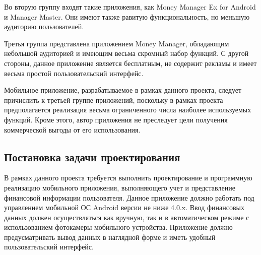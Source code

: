 Во вторую группу входят такие приложения, как
Money Manager Ex for Android и Manager Master.
Они имеют также равитую функциональность, но меньшую аудиторию пользователей.

Третья группа представлена приложением Money Manager,
обладающим небольшой аудиторией и имеющим весьма скромный набор функций.
С другой стороны, данное приложение является бесплатным, не содержит рекламы
и имеет весьма простой пользовательский интерфейс.

Мобильное приложение, разрабатываемое в рамках данного проекта,
следует причислить к третьей группе приложений,
поскольку в рамках проекта предполагается реализация весьма
ограниченного числа наиболее используемых функций.
Кроме этого, автор приложения не преследует цели получения коммерческой выгоды
от его использования.

\subsection{Постановка задачи проектирования}

В рамках данного проекта требуется выполнить проектирование и
программную реализацию мобильного приложения, выполняющего учет и представление
финансовой информации пользователя.
Данное приложение должно работать под управлением мобильной ОС Android версии
не ниже 4.0.x. Ввод финансовых данных должен осуществляться как вручную,
так и в автоматическом режиме с использованием фотокамеры мобильного устройства.
Приложение должно предусматривать вывод данных в наглядной форме и иметь
удобный пользовательский интерфейс.
